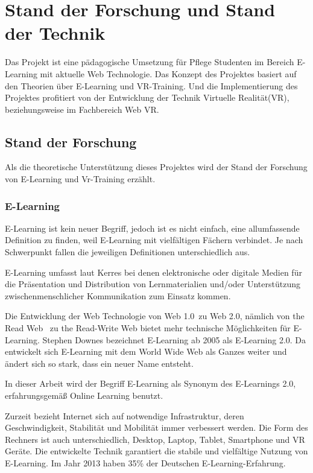 \chapter{Stand der Forschung und Stand der Technik}

Das Projekt ist eine pädagogische Umsetzung für Pflege Studenten im Bereich E-Learning mit aktuelle Web Technologie. Das Konzept des Projektes basiert auf den Theorien über E-Learning und VR-Training. Und die Implementierung des Projektes profitiert von der Entwicklung der Technik Virtuelle Realität(VR), beziehungsweise im Fachbereich Web VR.

\section{Stand der Forschung}

Als die theoretische Unterstützung dieses Projektes wird der Stand der Forschung von E-Learning und Vr-Training erzählt.

 \subsection{E-Learning}
 E-Learning ist kein neuer Begriff, jedoch ist es nicht einfach, eine allumfassende Definition zu finden, weil E-Learning mit vielfältigen Fächern verbindet. Je nach Schwerpunkt fallen die jeweiligen Definitionen unterschiedlich aus.

E-Learning umfasst laut Kerres \citep{1} \glqq bei denen elektronische oder digitale Medien für die Präsentation und Distribution von Lernmaterialien und/oder Unterstützung zwischenmenschlicher Kommunikation zum Einsatz kommen.\grqq

Die Entwicklung der Web Technologie von \glqq Web 1.0\grqq\ zu \glqq Web 2.0\grqq  \citep{3}, nämlich von \glqq the Read Web \grqq\ zu \glqq the Read-Write Web\grqq \citep{4} bietet mehr technische Möglichkeiten für E-Learning. Stephen Downes \citep{2} bezeichnet E-Learning ab 2005 als E-Learning 2.0. Da \glqq entwickelt sich E-Learning mit dem World Wide Web als Ganzes weiter und ändert sich so stark, dass ein neuer Name entsteht.\grqq

In dieser Arbeit wird der Begriff E-Learning als Synonym des E-Learnings 2.0, erfahrungsgemäß Online Learning benutzt.
 
Zurzeit bezieht Internet sich auf notwendige Infrastruktur, deren Geschwindigkeit, Stabilität und Mobilität immer verbessert werden. Die Form des Rechners ist auch unterschiedlich, Desktop, Laptop, Tablet, Smartphone und VR Geräte. Die entwickelte Technik garantiert die stabile und vielfältige Nutzung von E-Learning. Im Jahr 2013 haben 35\% der Deutschen E-Learning-Erfahrung.


